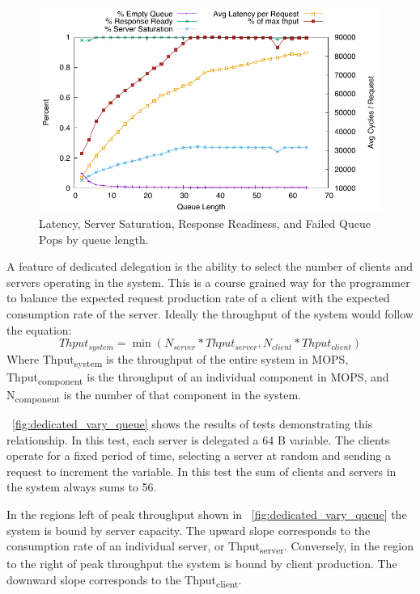 \documentclass{uicthesi}
\begin{document}
\begin{figure}[ht!]
\centering
\includegraphics[width=0.9\columnwidth]{FIG/16rldedicated_saturation.pdf}
\caption{Latency, Server Saturation, Response Readiness, and Failed Queue Pops by queue length.}
\label{fig:saturation16RL}
\end{figure}

A feature of dedicated delegation is the ability to select the number of clients and servers operating in the system. This is a course grained way for the programmer to balance the expected request production rate of a client with the expected consumption rate of the server. Ideally the throughput of the system would follow the equation: 
\begin{displaymath}
Thput_{system} = \min(N_{server} * Thput_{server}, N_{client} * Thput_{client})
\end{displaymath}
Where Thput\textsubscript{system} is the throughput of the entire system in MOPS, Thput\textsubscript{component} is the throughput of an individual component in MOPS, and N\textsubscript{component} is the number of that component in the system.  

~\ref{fig:dedicated_vary_queue} shows the results of tests demonstrating this relationship. In this test, each server is delegated a 64 B variable. The clients operate for a fixed period of time, selecting a server at random and sending a request to increment the variable. In this test the sum of clients and servers in the system always sums to 56.

In the regions left of peak throughput shown in  ~\ref{fig:dedicated_vary_queue} the system is bound by server capacity. The upward slope corresponds to the consumption rate of an individual server, or Thput\textsubscript{server}. Conversely, in the region to the right of peak throughput the system is bound by client production. The downward slope corresponds to the Thput\textsubscript{client}. 
\end{document}
